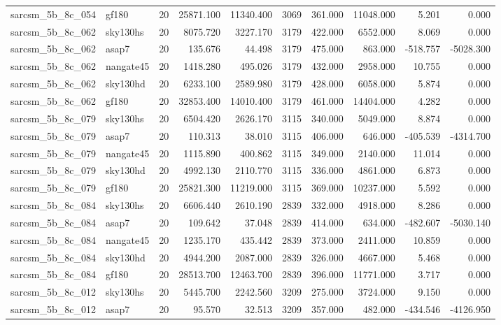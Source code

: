 \begin{longtable}{llrrrrrrrr}
sarcsm\_5b\_8c\_054 & gf180 & 20 & 25871.100 & 11340.400 & 3069 & 361.000 & 11048.000 & 5.201 & 0.000 \\
sarcsm\_5b\_8c\_062 & sky130hs & 20 & 8075.720 & 3227.170 & 3179 & 422.000 & 6552.000 & 8.069 & 0.000 \\
sarcsm\_5b\_8c\_062 & asap7 & 20 & 135.676 & 44.498 & 3179 & 475.000 & 863.000 & -518.757 & -5028.300 \\
sarcsm\_5b\_8c\_062 & nangate45 & 20 & 1418.280 & 495.026 & 3179 & 432.000 & 2958.000 & 10.755 & 0.000 \\
sarcsm\_5b\_8c\_062 & sky130hd & 20 & 6233.100 & 2589.980 & 3179 & 428.000 & 6058.000 & 5.874 & 0.000 \\
sarcsm\_5b\_8c\_062 & gf180 & 20 & 32853.400 & 14010.400 & 3179 & 461.000 & 14404.000 & 4.282 & 0.000 \\
sarcsm\_5b\_8c\_079 & sky130hs & 20 & 6504.420 & 2626.170 & 3115 & 340.000 & 5049.000 & 8.874 & 0.000 \\
sarcsm\_5b\_8c\_079 & asap7 & 20 & 110.313 & 38.010 & 3115 & 406.000 & 646.000 & -405.539 & -4314.700 \\
sarcsm\_5b\_8c\_079 & nangate45 & 20 & 1115.890 & 400.862 & 3115 & 349.000 & 2140.000 & 11.014 & 0.000 \\
sarcsm\_5b\_8c\_079 & sky130hd & 20 & 4992.130 & 2110.770 & 3115 & 336.000 & 4861.000 & 6.873 & 0.000 \\
sarcsm\_5b\_8c\_079 & gf180 & 20 & 25821.300 & 11219.000 & 3115 & 369.000 & 10237.000 & 5.592 & 0.000 \\
sarcsm\_5b\_8c\_084 & sky130hs & 20 & 6606.440 & 2610.190 & 2839 & 332.000 & 4918.000 & 8.286 & 0.000 \\
sarcsm\_5b\_8c\_084 & asap7 & 20 & 109.642 & 37.048 & 2839 & 414.000 & 634.000 & -482.607 & -5030.140 \\
sarcsm\_5b\_8c\_084 & nangate45 & 20 & 1235.170 & 435.442 & 2839 & 373.000 & 2411.000 & 10.859 & 0.000 \\
sarcsm\_5b\_8c\_084 & sky130hd & 20 & 4944.200 & 2087.000 & 2839 & 326.000 & 4667.000 & 5.468 & 0.000 \\
sarcsm\_5b\_8c\_084 & gf180 & 20 & 28513.700 & 12463.700 & 2839 & 396.000 & 11771.000 & 3.717 & 0.000 \\
sarcsm\_5b\_8c\_012 & sky130hs & 20 & 5445.700 & 2242.560 & 3209 & 275.000 & 3724.000 & 9.150 & 0.000 \\
sarcsm\_5b\_8c\_012 & asap7 & 20 & 95.570 & 32.513 & 3209 & 357.000 & 482.000 & -434.546 & -4126.950 \\

\end{longtable}
